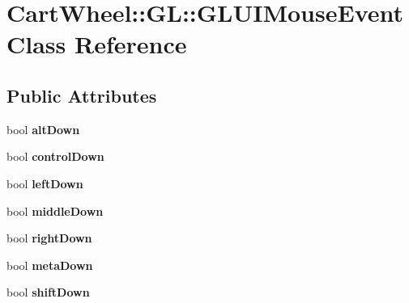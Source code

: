 \hypertarget{classCartWheel_1_1GL_1_1GLUIMouseEvent}{
\section{CartWheel::GL::GLUIMouseEvent Class Reference}
\label{classCartWheel_1_1GL_1_1GLUIMouseEvent}
}
\subsection*{Public Attributes}
\begin{DoxyCompactItemize}
\item 
\hypertarget{classCartWheel_1_1GL_1_1GLUIMouseEvent_a52c4bbd74cbb62a52616797b928f8ab9}{
bool {\bfseries altDown}}
\label{classCartWheel_1_1GL_1_1GLUIMouseEvent_a52c4bbd74cbb62a52616797b928f8ab9}

\item 
\hypertarget{classCartWheel_1_1GL_1_1GLUIMouseEvent_a351205933d6d3b6a1d8c30aee993120d}{
bool {\bfseries controlDown}}
\label{classCartWheel_1_1GL_1_1GLUIMouseEvent_a351205933d6d3b6a1d8c30aee993120d}

\item 
\hypertarget{classCartWheel_1_1GL_1_1GLUIMouseEvent_a13a40f60637405d983f5661972758a8d}{
bool {\bfseries leftDown}}
\label{classCartWheel_1_1GL_1_1GLUIMouseEvent_a13a40f60637405d983f5661972758a8d}

\item 
\hypertarget{classCartWheel_1_1GL_1_1GLUIMouseEvent_a39f0369b671a971ed346b7fb2b03065a}{
bool {\bfseries middleDown}}
\label{classCartWheel_1_1GL_1_1GLUIMouseEvent_a39f0369b671a971ed346b7fb2b03065a}

\item 
\hypertarget{classCartWheel_1_1GL_1_1GLUIMouseEvent_a55f35371aeef81e42d6f737cc3f2b287}{
bool {\bfseries rightDown}}
\label{classCartWheel_1_1GL_1_1GLUIMouseEvent_a55f35371aeef81e42d6f737cc3f2b287}

\item 
\hypertarget{classCartWheel_1_1GL_1_1GLUIMouseEvent_a6f5593c9abc6514dcd62a14f9f6102ed}{
bool {\bfseries metaDown}}
\label{classCartWheel_1_1GL_1_1GLUIMouseEvent_a6f5593c9abc6514dcd62a14f9f6102ed}

\item 
\hypertarget{classCartWheel_1_1GL_1_1GLUIMouseEvent_a8c35caaf2f79ccf6faa1ebbedb9a69f6}{
bool {\bfseries shiftDown}}
\label{classCartWheel_1_1GL_1_1GLUIMouseEvent_a8c35caaf2f79ccf6faa1ebbedb9a69f6}


\end{DoxyCompactItemize}
